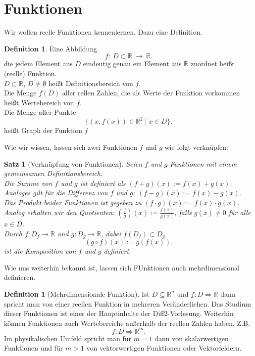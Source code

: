 \documentclass[fontsize=12pt,paper=a4,twoside,bibtotoc,idxtotoc,
liststotoc,pagesize,BCOR1.2cm,DIV15,chapterprefix,pagesize=pdftex]{scrbook}
\theoremstyle{plain}
\newtheorem{sz}[equation]{Satz}
\theoremstyle{definition}
\newtheorem{df}[equation]{Definition}
\theoremstyle{remark}
\begin{document}
\section{Funktionen}
Wir wollen reelle Funktionen kennenlernen. Dazu eine Definition.
\begin{df}
Eine Abbildung
\[f: \ D \subset \mathbb{R} \ \rightarrow \ \mathbb{R}.\]
die jedem Element aus $D$ eindeutig genau ein Element aus $\mathbb{R}$ zuordnet heißt (reelle) Funktion.\\
$D \subset \mathbb{R}$, $D \neq \emptyset$ heißt Definitionsbereich von $f$.\\
Die Menge $f(D)$ aller rellen Zahlen, die als Werte der
Funktion vorkommen heißt Wertebereich von $f$.\\
Die Menge aller Punkte 
\[ \{ (x,f(x)) \in \mathbb{R}^2 \;|\; x \in D\}. \]
heißt Graph der Funktion $f$
\end{df}
Wie wir wissen, lassen sich zwei Funktionen $f$ und $g$ wie folgt verknüpfen:
\begin{sz}[Verknüpfung von Funktionen]
Seien $f$ und $g$ Funktionen mit einem gemeinsamen Definitionsbereich.\\
Die Summe von $f$ und $g$ ist definiert als $(f+g)(x):=f(x)+g(x)$.\\
Analoges gilt für die Differenz von $f$ und $g$: $(f-g)(x):=f(x)-g(x)$.\\
Das Produkt beider Funktionen ist gegeben zu $(f\cdot g)(x):=f(x) \cdot g(x)$.\\
Analog erhalten wir den Quotienten: $(\frac{f}{g})(x):=\frac{f(x)}{g(x)}$, falls $g(x) \neq
0$ für alle $x \in D$.\\
Durch $f:D_f \rightarrow \mathbb{R}$ und $g:D_g \rightarrow \mathbb{R}$, 
dabei $f(D_f) \subset D_g$ 
\[(g \circ f) (x):=g(f(x)).\] 
ist die Komposition von $f$ und $g$ definiert.
\end{sz}
Wie uns weiterhin bekannt ist, lassen sich FUnktionen auch mehrdimensional definieren.
\begin{df}[Mehrdimensionale Funktion]
Ist $D \subseteq \mathbb{R}^n$ und $f : D \Rightarrow \mathbb{R}$ dann spricht man von
einer reellen Funktion in mehreren Veränderlichen. Das Studium dieser Funktionen ist einer der Hauptinhalte der Diff2-Vorlesung.
\bigskip
Weiterhin können Funktionen auch Wertebereiche außerhalb der reellen Zahlen haben.
Z.B. 
\[f : D \Rightarrow \mathbb{R}^m.\]
Im physikalischen Umfeld spricht man für $m=1$ dann von skalarwertigen Funktionen und für $m>1$ von vektorwertigen Funktionen oder Vektorfeldern.
\end{df} 
\end{document}
